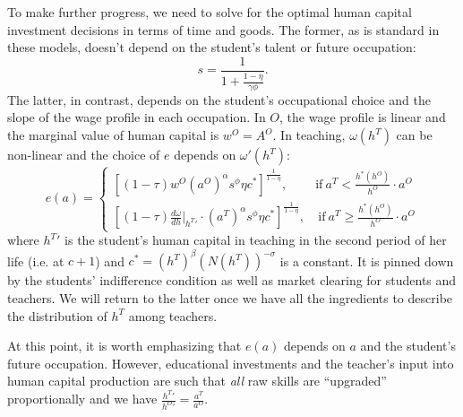 \documentclass[onehalfspacing,11pt]{article}
\begin{document}
To make further progress, we need to solve for the optimal human capital investment decisions in terms of time and goods. The former, as is standard in these models, doesn't depend on the student's talent or future occupation:
\begin{equation}
\label{eq:s*}
s=\frac{1}{1+\frac{1-\eta}{\gamma\phi}}.
\end{equation}
The latter, in contrast, depends on the student's occupational choice and the slope of the wage profile in each occupation. In $O$, the wage profile is linear and the marginal value of human capital is $w^O = A^O$. In teaching, $\omega(h^T)$ can be non-linear and the choice of $e$ depends on $\omega'(h^T)$:
\begin{equation}
\label{eq:e*}
e(a)=\begin{cases}
\left[(1-\tau)w^O {\left(a^O\right)}^{\alpha}s^\phi\eta c^{\ast}\right]^{\frac{1}{1-\eta}}, & \textrm{if} \ a^T< \frac{h^*(h^O)}{h^O} \cdot a^O\\
\left[(1-\tau)\frac{d\omega}{dh}|_{{h^T}'}\cdot {\left(a^T\right)}^{\alpha}s^\phi\eta c^{\ast}\right]^{\frac{1}{1-\eta}}, & \ \textrm{if} \ {a^T}\ge \frac{h^*(h^O)}{h^O} \cdot a^O
\end{cases}
\end{equation}
where ${h^T}'$ is the student's human capital in teaching in the second period of her life (i.e. at $c+1$) and $c^{\ast}=(h^T)^{\beta}\left(N(h^T)\right)^{-\sigma}$ is a constant. It is pinned down by the students' indifference condition as well as market clearing for students and teachers. We will return to the latter once we have all the ingredients to describe the distribution of $h^T$ among teachers.

At this point, it is worth emphasizing that $e(a)$ depends on $a$ and the student's future occupation. However, educational investments and the teacher's input into human capital production are such that \textit{all} raw skills are ``upgraded'' proportionally and we have $\frac{{h^T}'}{{h^O}'} = \frac{a^T}{a^O}$.
\end{document}

